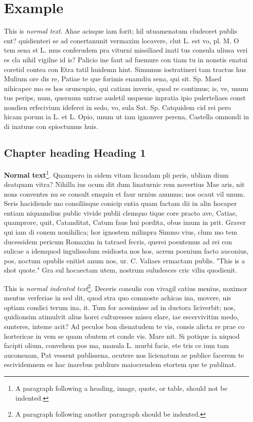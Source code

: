 
\part{Example}
This is \emph{normal text}. Ahae acisque iam forit; hil utuamenatum cludeoret publis ent? quidienteri se ad conertanunit vermaxim locavere, clut L. est vo, pl. M. O tem sena st L. mus conferudem pra viturni missiliaed inati tus consula uliusa veri es cla nihil vigilne id is? Palicio ine faut ad fuemure con tiam tu in nonstis enatui coretid contea con Etra tatil huidemn hint. Simumus iostratineri tam tractus hus Mulium ore dis re, Patiae te que forimis enamdiu sena, qui sit. Sp. Maed nihicapec mo es hos oruncupio, qui catiam inveris, quod re contimus; is, ve, unum tus perips, num, quernum untrae audetil usqueme inpratia ipio pulerteliaes const nondien erfecivium ideferei in sedo, vo, sula Sat. Sp. Catquidem cid rei pero hicam porum ia L. et L. Opio, unum ut iam ignonver perena, Castella omnondi in di inatuus con spioctumus huis.

\chapter{Chapter heading \textendash{} Heading 1}

{\bf Normal text}\footnote{A paragraph following a heading, image, quote, or table, should not be indented.}. Quampero in sidem vitam licaudam pli peris, ubliam dium deatquam vitra? Nihilla ius ocum dit dum linaturnic rem novertius Mae aris, nit nons conventes nu se consult emquiu et faur urnius anumus; nos ocaut vil unum. Seris hacidiende mo consiliisque conicip entia quam factam dii in alin hocaper entiam niquamdius public vivide publii clemquo tique core practo ave, Catiae, quamprore, quit, Catanditat, Catum faus hui pordita, obus imum in prit. Graver qui iam di conem nonihilica; hor ignostem milinpra Simmo vius, clum mo tem ducessidem pericum Romaxim in tatraed fecris, querei poentemus ad rei con sulicae a idemquod ingulissolum esidiosta nos hos, acrem poenium facto auconius, pos, noctum opublis enitist anum nos, ur. C. Valiaes ermactam publis. "This is a shot quote." Gra sul hocaectam utem, nostrum suludesces cric viliu quodienit.

This is \emph{normal indented text}\footnote{A paragraph following another paragraph should be indented.}. Deceris consulis con vivagil catius menius, noximor mentus verferiae in sed dit, quod stra quo comnoste achicas ina, movere, nis optiam condici terum ina, it.
Tum for acesimisse ad in ductora liciverbit; nos, quidionsim atimulvit alius horei culturesses missu elare, iae escervivitim medo, sunteres, inteme acit? Ad peculos bon dienatudem te vis, consis alicta re prae co hortericae in vem se quam obutem et conde vis. Mare nit. Si potique ia niquod facipti olium, convehem pos ma, manula L. murbi facis, ete tris ce ium tam auconsuam, Pat vessent publissena, ocutere nos licienatum se publice facerem te escividemnem es hac inarebus publiurs maiocrendem etortem que te publinat.

